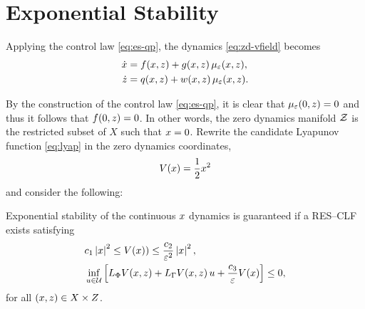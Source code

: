 \section{Exponential Stability}

Applying the control law \eqref{eq:es-qp}, the dynamics \eqref{eq:zd-vfield} becomes
%
\begin{align}
  \nonumber
  \dot {x} &= f(x, z) + g(x, z) \, \mu_{\varepsilon}(x, z),\\
  \dot {z} &= q(x, z) + w(x, z) \, \mu_{\varepsilon}(x, z).
  \label{eq:zd-vfield-cl}
\end{align}

By the construction of the control law \eqref{eq:es-qp}, it is clear that $\mu_{\varepsilon}(0, z) = 0$ and thus it follows that $f(0, z) = 0$.
%
In other words, the zero dynamics manifold $\mathcal{Z}$ is the restricted subset of $X$ such that $x = 0$.
%
Rewrite the candidate Lyapunov function \eqref{eq:lyap} in the zero dynamics coordinates,
%
\begin{align}
  V(x) = \frac{1}{2} x^{2}
\end{align}
and consider the following:\vgap

\begin{proposition}  
  \label{prop:res-clf}
  Exponential stability of the continuous $x$ dynamics is guaranteed if a RES--CLF exists satisfying
  \begin{eqnarray}
    \label{eq:lyap-cond-nrg-es}
    &c_{1} \left|x\right|^{2} \leq V(x)) \leq \frac{c_{2}}{\varepsilon^{2}} \left|x\right|^2,\\
    \nonumber
    &\inf_{u \in \mathcal{U}} \left[ L_{\Phi} V(x, z) + L_{\Gamma} V(x, z) \, u + \frac{c_{3}}{\varepsilon} V(x) \right] \leq 0,
  \end{eqnarray}
  for all $(x, z) \in X \times Z$.\vgap
\end{proposition}


